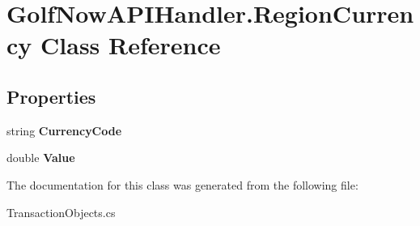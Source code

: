 \hypertarget{class_golf_now_a_p_i_handler_1_1_region_currency}{}\section{Golf\+Now\+A\+P\+I\+Handler.\+Region\+Currency Class Reference}
\label{class_golf_now_a_p_i_handler_1_1_region_currency}
\subsection*{Properties}
\begin{DoxyCompactItemize}
\item 
\mbox{\label{class_golf_now_a_p_i_handler_1_1_region_currency_a9576e6e3d1824b99f903c853bdb145d4}} 
string {\bfseries Currency\+Code}
\item 
\mbox{\label{class_golf_now_a_p_i_handler_1_1_region_currency_a155cf60b45b75776b269105607030bd0}} 
double {\bfseries Value}
\end{DoxyCompactItemize}


The documentation for this class was generated from the following file\+:\begin{DoxyCompactItemize}
\item 
Transaction\+Objects.\+cs\end{DoxyCompactItemize}
